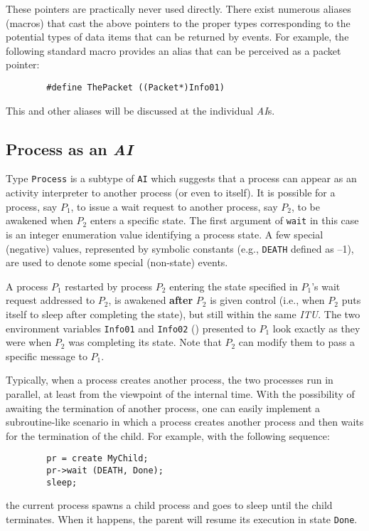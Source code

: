 These pointers are practically never used directly.
There exist numerous aliases (macros) that cast the above pointers to the
proper types corresponding to the potential types of
data items that can be returned by events.
For example, the following standard macro provides an alias
that can be perceived as a packet pointer:
\begin{verbatim}
        #define ThePacket ((Packet*)Info01)
\end{verbatim}
This and other aliases will be discussed at the individual {\em AI\/}s.

\subsection{Process as an {\em AI}}
\label{rm_pr_pa}

Type {\tt Process} is a subtype of {\tt AI} which suggests that a process
can appear as an activity interpreter to another process (or even to itself).
It is possible for a process, say $P_1$, to issue a wait request to
another process, say $P_2$, to be awakened when $P_2$ enters a
specific state.
The first argument of {\tt wait} in this case is an integer enumeration
value identifying a process state.
A few special (negative) values, represented by symbolic constants
(e.g., {\tt DEATH} defined as --1), are used to denote some
special (non-state) events.

A process $P_1$ restarted by process $P_2$ entering the state specified in
$P_1$'s wait request addressed to $P_2$, is awakened {\bf after} $P_2$ is
given control (i.e., when $P_2$ puts itself to sleep after completing the
state), but still within the same {\em ITU}.
The two environment variables {\tt Info01} and {\tt Info02} ()
presented to
$P_1$ look exactly as they were when $P_2$ was completing its state.
Note that $P_2$ can modify them to pass a specific message to $P_1$.

Typically, when a process creates another process, the two processes run
in parallel, at least from the viewpoint of the internal time.
With the possibility of awaiting the termination of another process, one
can easily implement a subroutine-like
scenario in which a process creates another process
and then waits for the termination of the child.
For example, with the following sequence:
\begin{verbatim}
        pr = create MyChild;
        pr->wait (DEATH, Done);
        sleep;
\end{verbatim}
the current process spawns a child process and goes to sleep until the
child terminates.
When it happens,
the parent will resume its execution in state {\tt Done}.

